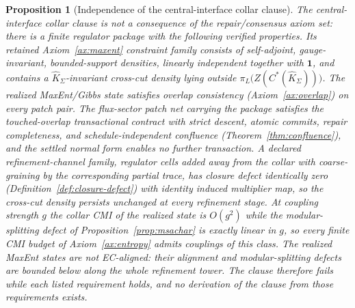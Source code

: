 \documentclass[11pt]{article}
\newtheorem{proposition}[theorem]{Proposition}
\begin{document}
\begin{proposition}[Independence of the central-interface collar clause]\label{prop:clauseindependence}
The central-interface collar clause is not a consequence of the repair/consensus axiom set: there is a finite regulator package with the following verified properties. Its retained Axiom~\ref{ax:maxent} constraint family consists of self-adjoint, gauge-invariant, bounded-support densities, linearly independent together with \(\mathbf 1\), and contains a \(\widehat K_\Sigma\)-invariant cross-cut density lying outside \(\pi_L\bigl(Z(C^*(\widehat K_\Sigma))\bigr)\). The realized MaxEnt/Gibbs state satisfies overlap consistency (Axiom~\ref{ax:overlap}) on every patch pair. The flux-sector patch net carrying the package satisfies the touched-overlap transactional contract with strict descent, atomic commits, repair completeness, and schedule-independent confluence (Theorem~\ref{thm:confluence}), and the settled normal form enables no further transaction. A declared refinement-channel family, regulator cells added away from the collar with coarse-graining by the corresponding partial trace, has closure defect identically zero (Definition~\ref{def:closure-defect}) with identity induced multiplier map, so the cross-cut density persists unchanged at every refinement stage. At coupling strength \(g\) the collar CMI of the realized state is \(O(g^2)\) while the modular-splitting defect of Proposition~\ref{prop:msachar} is exactly linear in \(g\), so every finite CMI budget of Axiom~\ref{ax:entropy} admits couplings of this class. The realized MaxEnt states are not EC-aligned: their alignment and modular-splitting defects are bounded below along the whole refinement tower. The clause therefore fails while each listed requirement holds, and no derivation of the clause from those requirements exists.
\end{proposition}
\end{document}
